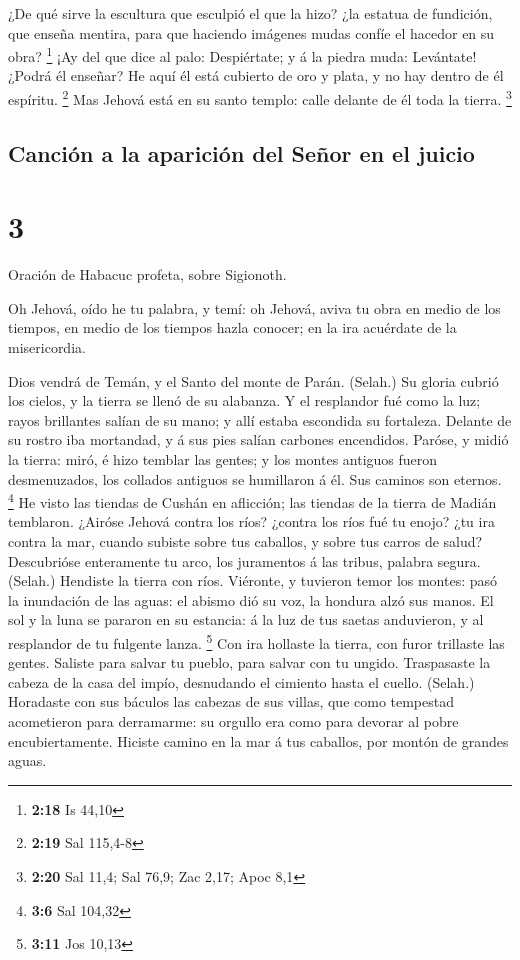  ¿De qué sirve la escultura que esculpió el que la hizo?
¿la estatua de fundición, que enseña mentira, para que haciendo imágenes
mudas confíe el hacedor en su obra? \footnote{\textbf{2:18} Is 44,10}
 ¡Ay del que dice al palo: Despiértate; y á la piedra muda:
Levántate! ¿Podrá él enseñar? He aquí él está cubierto de oro y plata, y
no hay dentro de él espíritu. \footnote{\textbf{2:19} Sal 115,4-8}
 Mas Jehová está en su santo templo: calle delante de él
toda la tierra. \footnote{\textbf{2:20} Sal 11,4; Sal 76,9; Zac 2,17;
  Apoc 8,1}

\hypertarget{canciuxf3n-a-la-apariciuxf3n-del-seuxf1or-en-el-juicio}{%
\subsection{Canción a la aparición del Señor en el
juicio}\label{canciuxf3n-a-la-apariciuxf3n-del-seuxf1or-en-el-juicio}}

\hypertarget{section-2}{%
\section{3}\label{section-2}}

 Oración de Habacuc profeta, sobre Sigionoth.

 Oh Jehová, oído he tu palabra, y temí: oh Jehová, aviva tu
obra en medio de los tiempos, en medio de los tiempos hazla conocer; en
la ira acuérdate de la misericordia.

 Dios vendrá de Temán, y el Santo del monte de Parán.
(Selah.) Su gloria cubrió los cielos, y la tierra se llenó de su
alabanza.  Y el resplandor fué como la luz; rayos brillantes
salían de su mano; y allí estaba escondida su fortaleza. 
Delante de su rostro iba mortandad, y á sus pies salían carbones
encendidos.  Paróse, y midió la tierra: miró, é hizo temblar
las gentes; y los montes antiguos fueron desmenuzados, los collados
antiguos se humillaron á él. Sus caminos son eternos. \footnote{\textbf{3:6}
  Sal 104,32}  He visto las tiendas de Cushán en aflicción;
las tiendas de la tierra de Madián temblaron.  ¿Airóse
Jehová contra los ríos? ¿contra los ríos fué tu enojo? ¿tu ira contra la
mar, cuando subiste sobre tus caballos, y sobre tus carros de salud?
 Descubrióse enteramente tu arco, los juramentos á las
tribus, palabra segura. (Selah.) Hendiste la tierra con ríos.
 Viéronte, y tuvieron temor los montes: pasó la inundación
de las aguas: el abismo dió su voz, la hondura alzó sus manos.
 El sol y la luna se pararon en su estancia: á la luz de
tus saetas anduvieron, y al resplandor de tu fulgente lanza. \footnote{\textbf{3:11}
  Jos 10,13}  Con ira hollaste la tierra, con furor
trillaste las gentes.  Saliste para salvar tu pueblo, para
salvar con tu ungido. Traspasaste la cabeza de la casa del impío,
desnudando el cimiento hasta el cuello. (Selah.)  Horadaste
con sus báculos las cabezas de sus villas, que como tempestad
acometieron para derramarme: su orgullo era como para devorar al pobre
encubiertamente.  Hiciste camino en la mar á tus caballos,
por montón de grandes aguas.

